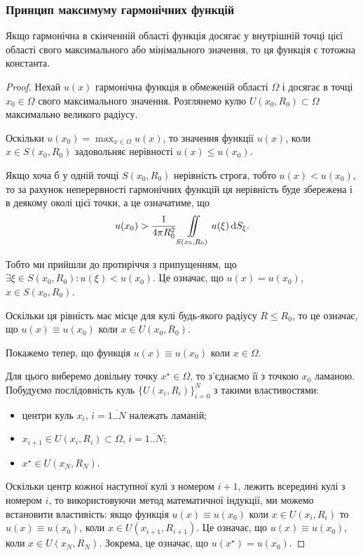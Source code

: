 \subsubsection{Принцип максимуму гармонічних функцій}

\begin{theorem}
	Якщо гармонічна в скінченній області функція досягає у внутрішній точці цієї області свого максимального або мінімального значення, то ця функція є тотожна константа.
\end{theorem}

\begin{proof}
	Нехай $u(x)$ гармонічна функція в обмеженій області $\Omega$ і досягає в точці $x_0 \in \Omega$ свого максимального значення. Розглянемо кулю $U(x_0, R_0) \subset \Omega$ максимально великого радіусу. \medskip

	Оскільки $u(x_0) = \max_{x \in \Omega} u(x)$, то значення функції $u(x)$, коли $x \in S(x_0, R_0)$ задовольняє нерівності $u(x) \le u(x_0)$. \medskip

	Якщо хоча б у одній точці $S(x_0, R_0)$ нерівність строга, тобто $u(x) < u(x_0)$, то за рахунок неперервності гармонічних функцій ця нерівність буде збережена і в деякому околі цієї точки, а це означатиме, що
	\begin{equation}
		u(x_0) > \frac{1}{4 \pi R_0^2} \displaystyle\iint\limits_{S(x_0,R_0)} u(\xi) \mathop{}\!\mathrm{d} S_\xi.
	\end{equation}

	Тобто ми прийшли до протиріччя з припущенням, що $\exists \xi \in S(x_0, R_0): u(\xi) < u(x_0)$. Це означає, що $u(x) = u(x_0)$, $x \in S(x_0, R_0)$. \medskip

	Оскільки ця рівність має місце для кулі будь-якого радіусу $R \le R_0$, то це означає, що $u(x) \equiv u(x_0)$  коли $x \in U(x_0, R_0)$. \medskip

	Покажемо тепер, що функція $u(x) \equiv u(x_0)$  коли $x \in \Omega$. \medskip

	Для цього виберемо довільну точку $x^\star \in \Omega$, то з'єднаємо її з точкою $x_0$ ламаною. Побудуємо послідовність куль $\{U(x_i, R_i)\}_{i=0}^N$ з такими властивостями: 
	\begin{itemize}
		\item центри куль $x_i$, $i = \overline{1..N}$ належать ламаній;
		\item $x_{i + 1} \in U(x_i, R_i) \subset \Omega$, $i = \overline{1..N}$;
		\item $x^\star \in U(x_N, R_N)$.
	\end{itemize}

	Оскільки центр кожної наступної кулі з номером $i + 1$, лежить всередині кулі з номером $i$, то використовуючи метод математичної індукції, ми можемо встановити властивість: якщо функція $u(x) \equiv u(x_0)$ коли $x \in U(x_i, R_i)$ то $u(x) \equiv u(x_0)$, коли $x \in U(x_{i+1}, R_{i+1})$. Це означає, що $u(x) \equiv u(x_0)$, коли $x \in U(x_N, R_N)$. Зокрема, це означає, що $u(x^\star) = u(x_0)$.
\end{proof}


